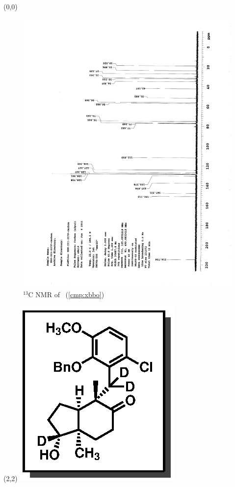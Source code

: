 \clearpage
\begin{textblock}{20}(0,0)
\begin{figure}[htb]
\caption{$^{13}$C NMR of  \CMPxbbo\ (\ref{cmp:xbbo})}
\includegraphics[scale=0.75, trim = 0mm 0mm 0mm 5mm,
clip]{chp_singlecarbon/images/nmr/xbboC}
\vspace{-100pt}
\end{figure}
\end{textblock}
\begin{textblock}{1}(2,2)
\includegraphics[scale=0.8, angle=90]{chp_singlecarbon/images/xbbo}
\end{textblock}
\clearpage


